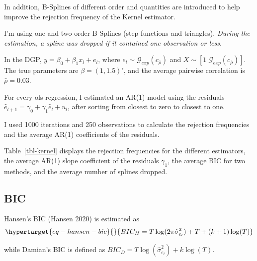 \documentclass[
]{article}
\begin{document}
In addition, B-Splines of different order and quantities are introduced
to help improve the rejection frequency of the Kernel estimator.

I'm using one and two-order B-Splines (step functions and triangles).
\emph{During the estimation, a spline was dropped if it contained one
observation or less.}

In the DGP, \(y=\beta_0 + \beta_1 x_l +e_l\), where
\(e_l\sim\mathcal{G}_{exp}(c_{\bar\rho})\) and
\(X\sim[1 \;\mathcal{G}_{exp}(c_{\bar\rho})]\). The true parameters are
\(\beta=(1, 1.5)'\), and the average pairwise correlation is
\(\bar\rho=0.03\).

For every ols regression, I estimated an AR(1) model using the residuals
\(\hat{e}_{l+1}=\gamma_0+\gamma_1 \hat{e}_l + u_l\), after sorting from
closest to zero to closest to one.

I used 1000 iterations and 250 observations to calculate the rejection
frequencies and the average AR(1) coefficients of the residuals.

Table~\ref{tbl-kernel} displays the rejection frequencies for the
different estimators, the average AR(1) slope coefficient of the
residuals \(\gamma_1\), the average BIC for two methods, and the average
number of splines dropped.

\hypertarget{bic}{%
\subsection{BIC}\label{bic}}

Hansen's BIC (Hansen 2020) is estimated as
\begin{equation}\protect\hypertarget{eq-hansen-bic}{}{
BIC_H=T\log(2\pi\hat{\sigma}^2_{e_l})+T+(k+1)\log(T)
}\label{eq-hansen-bic}\end{equation}

while Damian's BIC is defined as
\(BIC_D=T\log(\hat{\sigma}^2_{e_l})+k\log(T)\).
\end{document}
